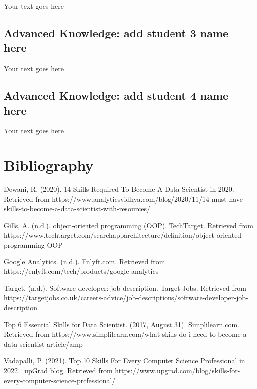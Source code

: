 \documentclass[a4paper, 11pt]{report}
\begin{document}
Your text goes here

\subsection{Advanced Knowledge: add student 3 name here}

Your text goes here

\subsection{Advanced Knowledge: add student 4 name here}

Your text goes here




\newpage




\section{Bibliography}

\hangindent=1cm Dewani, R. (2020). 14 Skills Required To Become A Data Scientist in 2020. Retrieved from https://www.analyticsvidhya.com/blog/2020/11/14-must-have-skills-to-become-a-data-scientist-with-resources/ 

\bigskip

\hangindent=1cm Gills, A. (n.d.). object-oriented programming (OOP). TechTarget. Retrieved from https://www.techtarget.com/searchapparchitecture/definition/object-oriented-programming-OOP

\bigskip

\hangindent=1cm Google Analytics. (n.d.). Enlyft.com. Retrieved from https://enlyft.com/tech/products/google-analytics

\bigskip

\hangindent=1cm Target. (n.d.). Software developer: job description. Target Jobs. Retrieved from https://targetjobs.co.uk/careers-advice/job-descriptions/software-developer-job-description

\bigskip

\hangindent=1cm Top 6 Essential Skills for Data Scientist. (2017, August 31). Simplilearn.com. Retrieved from https://www.simplilearn.com/what-skills-do-i-need-to-become-a-data-scientist-article/amp

\bigskip

\hangindent=1cm Vadapalli, P. (2021). Top 10 Skills For Every Computer Science Professional in 2022 | upGrad blog. Retrieved from https://www.upgrad.com/blog/skills-for-every-computer-science-professional/ 
\end{document}
